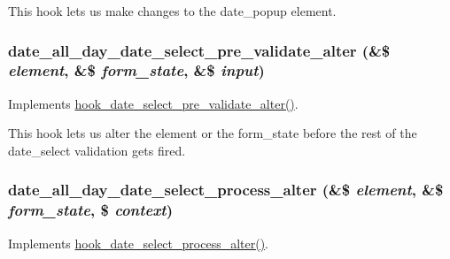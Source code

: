This hook lets us make changes to the date\_\-popup element. \hypertarget{date__all__day_8module_ab13518df6a1115c872752e88b22efe3c}{
\subsubsection[{date\_\-all\_\-day\_\-date\_\-select\_\-pre\_\-validate\_\-alter}]{\setlength{\rightskip}{0pt plus 5cm}date\_\-all\_\-day\_\-date\_\-select\_\-pre\_\-validate\_\-alter (\&\$ {\em element}, \/  \&\$ {\em form\_\-state}, \/  \&\$ {\em input})}}
\label{date__all__day_8module_ab13518df6a1115c872752e88b22efe3c}
Implements \hyperlink{date_8api_8php_a8fa3364916ca73163501f3b9fa319dd6}{hook\_\-date\_\-select\_\-pre\_\-validate\_\-alter()}.

This hook lets us alter the element or the form\_\-state before the rest of the date\_\-select validation gets fired. \hypertarget{date__all__day_8module_a03eba5b1126dcdea600f9186d3d9bc33}{
\subsubsection[{date\_\-all\_\-day\_\-date\_\-select\_\-process\_\-alter}]{\setlength{\rightskip}{0pt plus 5cm}date\_\-all\_\-day\_\-date\_\-select\_\-process\_\-alter (\&\$ {\em element}, \/  \&\$ {\em form\_\-state}, \/  \$ {\em context})}}
\label{date__all__day_8module_a03eba5b1126dcdea600f9186d3d9bc33}
Implements \hyperlink{date_8api_8php_a0688e456a52d3e4bdaaa63337d49e74c}{hook\_\-date\_\-select\_\-process\_\-alter()}.

